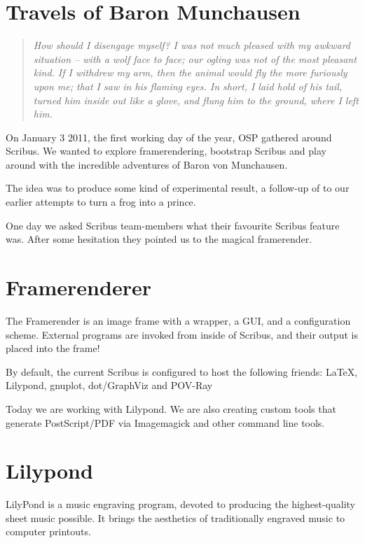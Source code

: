 \documentclass{article}
\begin{document}
\section*{Travels of Baron Munchausen}
\begin{quote}
\textit{How should I disengage myself? I was not much pleased with my awkward
situation -- with a wolf face to face; our ogling was not of the most pleasant
kind. If I withdrew my arm, then the animal would fly the more furiously upon
me; that I saw in his flaming eyes. In short, I laid hold of his tail, turned
him inside out like a glove, and flung him to the ground, where I left him.}
\end{quote}

On January 3 2011, the first working day of the year, OSP gathered around
Scribus. We wanted to explore framerendering, bootstrap Scribus and play
around with the incredible adventures of Baron von Munchausen.

The idea was to produce some kind of experimental result, a follow-up of to
our earlier attempts to turn a frog into a prince.

One day we asked Scribus team-members what their favourite Scribus feature
was. After some hesitation they pointed us to the magical framerender.

\section*{Framerenderer}
The Framerender is an image frame with a wrapper, a GUI, and a configuration
scheme. External programs are invoked from inside of Scribus, and their output
is placed into the frame!

By default, the current Scribus is configured to host the following friends:
LaTeX, Lilypond, gnuplot, dot/GraphViz and POV-Ray

Today we are working with Lilypond. We are also creating custom tools that
generate PostScript/PDF via Imagemagick and other command line tools.

\section*{Lilypond}
LilyPond is a music engraving program, devoted to producing the
highest-quality sheet music possible.  It brings the aesthetics of
traditionally engraved music to computer printouts.
\end{document}
